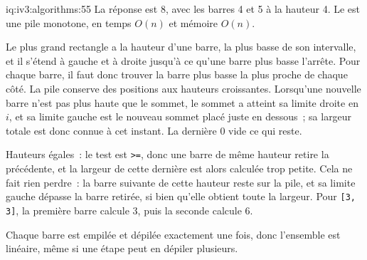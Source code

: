 \begin{solution}{iq:iv3:algorithms:55}
La réponse est 8, avec les barres 4 et 5 à la hauteur 4. Le  est une pile monotone, en temps $O(n)$ et mémoire $O(n)$.
\enlargethispage{-3\baselineskip}%
\label{lst:iv3:al:histogram}

Le plus grand rectangle a la hauteur d'une barre, la plus basse de son intervalle, et il s'étend à gauche et à droite jusqu'à ce qu'une barre plus basse l'arrête. Pour chaque barre, il faut donc trouver la barre plus basse la plus proche de chaque côté. La pile conserve des positions aux hauteurs croissantes. Lorsqu'une nouvelle barre n'est pas plus haute que le sommet, le sommet a atteint sa limite droite en $i$, et sa limite gauche est le nouveau sommet placé juste en dessous~; sa largeur totale est donc connue à cet instant. La dernière 0 vide ce qui reste.

Hauteurs égales~: le test est \texttt{>=}, donc une barre de même hauteur retire la précédente, et la largeur de cette dernière est alors calculée trop petite. Cela ne fait rien perdre~: la barre suivante de cette hauteur reste sur la pile, et sa limite gauche dépasse la barre retirée, si bien qu'elle obtient toute la largeur. Pour \texttt{[3, 3]}, la première barre calcule 3, puis la seconde calcule 6.

Chaque barre est empilée et dépilée exactement une fois, donc l'ensemble est linéaire, même si une étape peut en dépiler plusieurs.

\end{solution}

